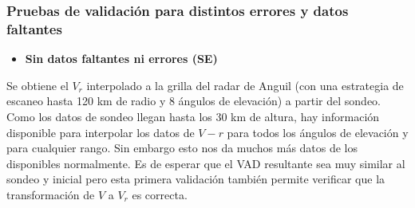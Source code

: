 \documentclass[12pt,spanish,oneside]{book}
\providecommand{\tightlist}{%
  \setlength{\itemsep}{0pt}\setlength{\parskip}{0pt}}
\begin{document}
\subsubsection{Pruebas de validación para distintos errores y datos
faltantes}\label{pruebas-de-validacion-para-distintos-errores-y-datos-faltantes}

\begin{itemize}
\tightlist
\item
  \textbf{Sin datos faltantes ni errores (SE)}
\end{itemize}

Se obtiene el \(V_r\) interpolado a la grilla del radar de Anguil (con
una estrategia de escaneo hasta 120 km de radio y 8 ángulos de
elevación) a partir del sondeo. Como los datos de sondeo llegan hasta
los 30 km de altura, hay información disponible para interpolar los
datos de \(V-r\) para todos los ángulos de elevación y para cualquier
rango. Sin embargo esto nos da muchos más datos de los disponibles
normalmente. Es de esperar que el VAD resultante sea muy similar al
sondeo y inicial pero esta primera validación también permite verificar
que la transformación de \(V\) a \(V_r\) es correcta.
\end{document}
